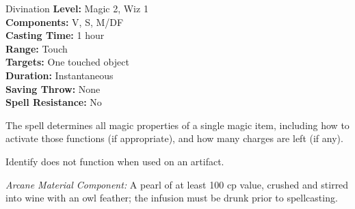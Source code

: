 {Divination}
{
	\textbf{Level:}
	Magic 2, Wiz 1\\
	\textbf{Components:}
	V, S, M/DF\\
	\textbf{Casting Time:}
	1 hour\\
	\textbf{Range:}
	Touch\\
	\textbf{Targets:}
	One touched object\\
	\textbf{Duration:}
	Instantaneous\\
	\textbf{Saving Throw:}
	None\\
	\textbf{Spell Resistance:}
	No\\
}
{
	The spell determines all magic properties of a single magic item, including how to activate those functions (if appropriate), and how many charges are left (if any).

	Identify does not function when used on an artifact.

	\textit{Arcane Material Component:}
	A pearl of at least 100 cp value, crushed and stirred into wine with an owl feather; the infusion must be drunk prior to spellcasting.

}

